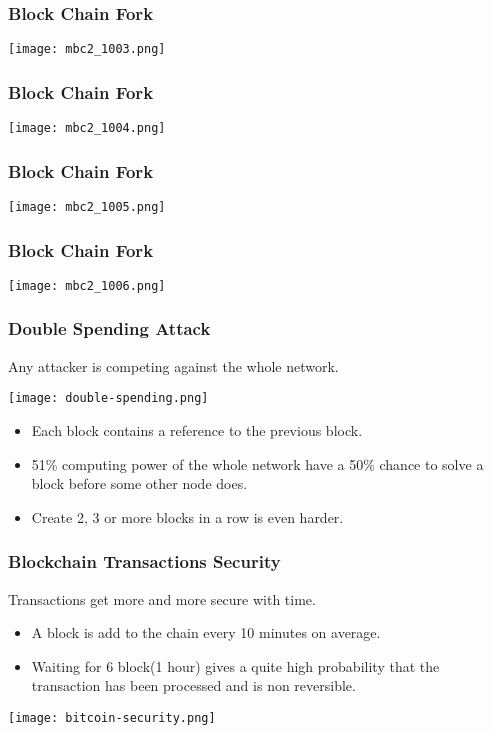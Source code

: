 \begin{frame}
    \frametitle{Block Chain Fork}
    \texttt{[image: mbc2\_1003.png]}
\end{frame}

\begin{frame}
    \frametitle{Block Chain Fork}
    \texttt{[image: mbc2\_1004.png]}
\end{frame}

\begin{frame}
    \frametitle{Block Chain Fork}
    \texttt{[image: mbc2\_1005.png]}
\end{frame}

\begin{frame}
    \frametitle{Block Chain Fork}
    \texttt{[image: mbc2\_1006.png]}
\end{frame}

\begin{frame}
    \frametitle{Double Spending Attack}
    Any attacker is competing against the whole network.
    \begin{center}
        \texttt{[image: double-spending.png]}
    \end{center}
    \begin{itemize}
        \item Each block contains a reference to the previous block.
        \item 51\% computing power of the whole network have a 50\% chance to solve a block before some other node does.
        \item Create 2, 3 or more blocks in a row is even harder.
    \end{itemize}
\end{frame}

\begin{frame}
    \frametitle{Blockchain Transactions Security}
    Transactions get more and more secure with time.
    \begin{itemize}
        \item A block is add to the chain every 10 minutes on average.
        \item Waiting for 6 block(1 hour) gives a quite high probability that the transaction has been processed and is \alert{non reversible}.
    \end{itemize}
    \texttt{[image: bitcoin-security.png]}
\end{frame}

